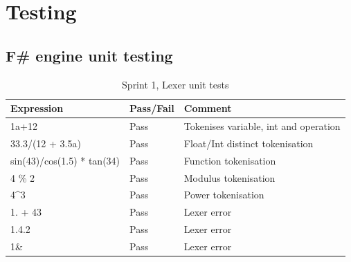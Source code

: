 \documentclass[a4paper, oneside, 11pt]{report}
\begin{document}
\chapter{Testing}
\label{app:test}

\section{F\# engine unit testing}

\begin{table}[h]
\caption{Sprint 1, Lexer unit tests}
\label{sprint1-lexer-test}
\begin{tabular}{|l|l|l|}
\hline
\textbf{Expression}        & \textbf{Pass/Fail} & \textbf{Comment}                      \\ \hline
1a+12                      & Pass               & Tokenises variable, int and operation \\ \hline
33.3/(12 + 3.5a)           & Pass               & Float/Int distinct tokenisation       \\ \hline
sin(43)/cos(1.5) * tan(34) & Pass               & Function tokenisation                 \\ \hline
4 \% 2                     & Pass               & Modulus tokenisation                  \\ \hline
4\textasciicircum{}3       & Pass               & Power tokenisation                    \\ \hline
1. + 43                    & Pass               & Lexer error                           \\ \hline
1.4.2                      & Pass               & Lexer error                           \\ \hline
1\&                        & Pass               & Lexer error                           \\ \hline
\end{tabular}
\end{table}
\end{document}
